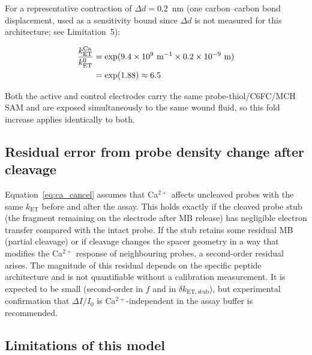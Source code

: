 \documentclass[10pt,a4paper]{article}
\numberwithin{equation}{section}
\begin{document}
For a representative contraction of $\Delta d = 0.2$~nm (one carbon--carbon bond
displacement, used as a sensitivity bound since $\Delta d$ is not measured for this
architecture; see Limitation~5):

\begin{align}
  \frac{k_{\mathrm{ET}}^{\mathrm{Ca}}}{k_{\mathrm{ET}}^0}
    &= \exp(9.4 \times 10^9\ \text{m}^{-1}
             \times 0.2 \times 10^{-9}\ \text{m}) \label{eq:kfold_plug} \\
    &= \exp(1.88) \approx 6.5 \notag
\end{align}

Both the active and control electrodes carry the same probe-thiol/C6FC/MCH SAM and are
exposed simultaneously to the same wound fluid, so this fold increase applies identically
to both.

\subsection{Residual error from probe density change after cleavage}

Equation~\eqref{eq:ca_cancel} assumes that Ca$^{2+}$ affects uncleaved probes with the
same $k_{\mathrm{ET}}$ before and after the assay. This holds exactly if the cleaved
probe stub (the fragment remaining on the electrode after MB release) has negligible
electron transfer compared with the intact probe. If the stub retains some residual MB
(partial cleavage) or if cleavage changes the spacer geometry in a way that modifies
the Ca$^{2+}$ response of neighbouring probes, a second-order residual arises. The
magnitude of this residual depends on the specific peptide architecture and is not
quantifiable without a calibration measurement. It is expected to be small (second-order
in $f$ and in $\delta k_{\mathrm{ET,stub}}$), but experimental confirmation that
$\Delta I/I_0$ is Ca$^{2+}$-independent in the assay buffer is recommended.

\subsection{Limitations of this model}
\end{document}
